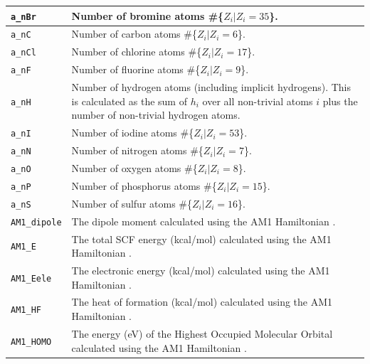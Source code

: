 \documentclass[12pt,a4paper]{article}
\begin{document}
\begin{longtable}{@{\zz}|p{}|p{}|}
\texttt{a\_nBr} & Number of bromine atoms \#\{$Z_i | Z_i = 35$\}.\\ \hline

\texttt{a\_nC} & Number of carbon atoms \#\{$Z_i | Z_i = 6$\}.\\ \hline

\texttt{a\_nCl} & Number of chlorine atoms \#\{$Z_i | Z_i = 17$\}.\\ \hline

\texttt{a\_nF} & Number of fluorine atoms \#\{$Z_i | Z_i = 9$\}.\\ \hline

\texttt{a\_nH} & Number of hydrogen atoms (including implicit hydrogens). This 
is calculated as the sum of $h_i$ over all non-trivial atoms $i$ plus the 
number of non-trivial hydrogen atoms.\\ \hline

\texttt{a\_nI} & Number of iodine atoms \#\{$Z_i | Z_i = 53$\}.\\ \hline

\texttt{a\_nN} & Number of nitrogen atoms \#\{$Z_i | Z_i = 7$\}.\\ \hline

\texttt{a\_nO} & Number of oxygen atoms \#\{$Z_i | Z_i = 8$\}.\\ \hline

\texttt{a\_nP} & Number of phosphorus atoms \#\{$Z_i | Z_i = 15$\}.\\ \hline

\texttt{a\_nS} & Number of sulfur atoms \#\{$Z_i | Z_i = 16$\}.\\ \hline

\texttt{AM1\_dipole} & The dipole moment calculated using the AM1 Hamiltonian 
\cite{MOPAC1993}.\\ \hline

\texttt{AM1\_E} & The total SCF energy (kcal/mol) calculated using the AM1 
Hamiltonian \cite{MOPAC1993}.\\ \hline

\texttt{AM1\_Eele} & The electronic energy (kcal/mol) calculated using the AM1 
Hamiltonian \cite{MOPAC1993}.\\ \hline

\texttt{AM1\_HF} & The heat of formation (kcal/mol) calculated using the AM1 
Hamiltonian \cite{MOPAC1993}.\\ \hline

\texttt{AM1\_HOMO} & The energy (eV) of the Highest Occupied Molecular Orbital 
calculated using the AM1 Hamiltonian \cite{MOPAC1993}.\\ \hline


\end{longtable}
\end{document}
